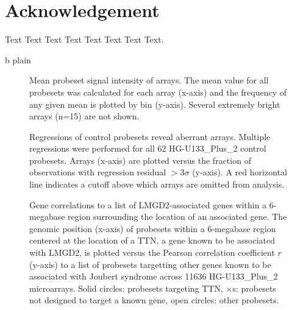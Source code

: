 \documentclass{bioinfo}
\begin{document}
\section*{Acknowledgement}
Text Text Text Text Text Text  Text Text.

 {b}
 {plain}
\newpage



\begin{figure}[!tpb]
\label{figure:means}
\centerline{}
\caption{Mean probeset signal intensity of arrays.  The mean value for all probesets was
calculated for each array (x-axis) and the frequency of any given mean is
plotted by bin (y-axis).  Several extremely bright arrays (n=15) are not shown.}
\end{figure}


\begin{figure}[!tpb]
\label{figure:rsquare}
\centerline{}
\caption{Regressions of control probesets reveal aberrant arrays.  Multiple regressions
were performed for all 62 HG-U133\_Plus\_2 control probesets.  Arrays (x-axis)
are plotted versus the fraction of observations with regression residual
$>3\sigma$ (y-axis).  A red horizontal line indicates a cutoff above which
arrays are omitted from analysis.}
\end{figure}


\begin{figure}[!tpb]
\label{figure:TTN}
\centerline{}
\caption{Gene correlations to a list of LMGD2-associated genes within a
6-megabase region surrounding the location of an associated gene.  The genomic
position (x-axis) of probesets within a 6-megabase region centered at the
location of a TTN, a gene known to be associated with LMGD2, is plotted versus
the Pearson correlation coefficient $r$ (y-axis) to a list of probesets
targetting other genes known to be associated with Joubert syndrome across
11636 HG-U133\_Plus\_2 microarrays.  Solid circles: probesets targeting TTN,
$\times$s: probesets not designed to target a known gene, open circles: other
probesets.}
\end{figure}
\end{document}
